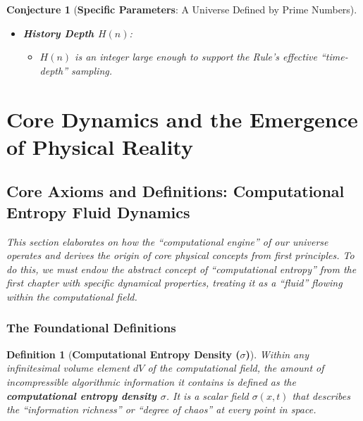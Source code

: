 \documentclass[11pt, a4paper]{article}
\newtheorem{definition}{Definition}[section]
\newtheorem{conjecture}{Conjecture}[section] %
\begin{document}
\begin{conjecture}[\textbf{Specific Parameters}: A Universe Defined by Prime Numbers]
\begin{itemize}
\begin{itemize}
        \item \textbf{Ultimate Conjecture}: The computational core size of this ultimate layer, $S(N)$, is the first \textbf{prime number} whose size is comparable to the topological scale of the entire universe. The state of this ``physical boundary,'' determined jointly by the physical size of the universe and the distribution of prime numbers, represents the ultimate macroscopic state of the universe.
    \end{itemize}
    \item \textbf{History Depth $H(n)$}:
    \begin{itemize}
        \item $H(n)$ is an integer large enough to support the Rule's effective ``time-depth'' sampling.
    \end{itemize}
\end{itemize}
\end{conjecture}









\section{Core Dynamics and the Emergence of Physical Reality}

\subsection{Core Axioms and Definitions: Computational Entropy Fluid Dynamics}

\textit{This section elaborates on how the ``computational engine'' of our universe operates and derives the origin of core physical concepts from first principles. To do this, we must endow the abstract concept of ``computational entropy'' from the first chapter with specific dynamical properties, treating it as a ``fluid'' flowing within the computational field.}

\subsubsection{The Foundational Definitions}

\begin{definition}[\textbf{Computational Entropy Density ($\sigma$)}]
Within any infinitesimal volume element $dV$ of the computational field, the amount of incompressible algorithmic information it contains is defined as the \textbf{computational entropy density $\sigma$}. It is a scalar field $\sigma(x, t)$ that describes the ``information richness'' or ``degree of chaos'' at every point in space.
\end{definition}
\end{document}
